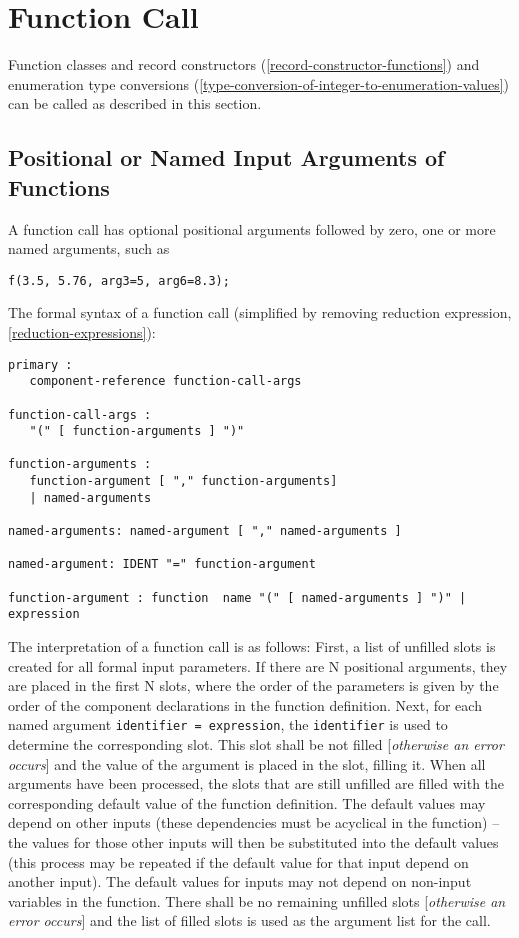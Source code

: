 \section{Function Call}

Function classes and record constructors (\autoref{record-constructor-functions}) and enumeration type
conversions (\autoref{type-conversion-of-integer-to-enumeration-values}) can be called as described in this section.

\subsection{Positional or Named Input Arguments of Functions}

A function call has optional positional arguments followed by zero, one
or more named arguments, such as

\begin{lstlisting}[language=modelica]
f(3.5, 5.76, arg3=5, arg6=8.3);
\end{lstlisting}

The formal syntax of a function call (simplified by removing reduction
expression, \autoref{reduction-expressions}):
\begin{lstlisting}[language=grammar]
primary :
   component-reference function-call-args

function-call-args :
   "(" [ function-arguments ] ")"

function-arguments :
   function-argument [ "," function-arguments]
   | named-arguments

named-arguments: named-argument [ "," named-arguments ]

named-argument: IDENT "=" function-argument

function-argument : function  name "(" [ named-arguments ] ")" | expression
\end{lstlisting}

The interpretation of a function call is as follows: First, a list of
unfilled slots is created for all formal input parameters. If there are
N positional arguments, they are placed in the first N slots, where the
order of the parameters is given by the order of the component
declarations in the function definition. Next, for each named argument
\lstinline!identifier = expression!, the \lstinline!identifier! is used to determine the
corresponding slot. This slot shall be not filled {[}\emph{otherwise an
error occurs}{]} and the value of the argument is placed in the slot,
filling it. When all arguments have been processed, the slots that are
still unfilled are filled with the corresponding default value of the
function definition. The default values may depend on other inputs
(these dependencies must be acyclical in the function) -- the values for
those other inputs will then be substituted into the default values
(this process may be repeated if the default value for that input depend
on another input). The default values for inputs may not depend on
non-input variables in the function. There shall be no remaining
unfilled slots {[}\emph{otherwise an error occurs}{]} and the list of
filled slots is used as the argument list for the call.

